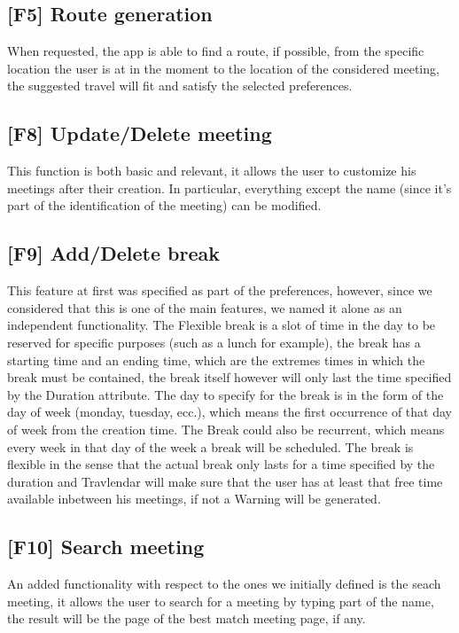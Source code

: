 \subsection{[F5] Route generation}
When requested, the app is able to find a route, if possible, from the specific location the user is at in the moment to the location of the considered meeting, the suggested travel will fit and satisfy the selected preferences.

\subsection{[F8] Update/Delete meeting}
This function is both basic and relevant, it allows the user to customize his meetings after their creation. In particular, everything except the name (since it's part of the identification of the meeting) can be modified.

\subsection{[F9] Add/Delete break}
This feature at first was specified as part of the preferences, however, since we considered that this is one of the main features, we named it alone as an independent functionality. The Flexible break is a slot of time in the day to be reserved for specific purposes (such as a lunch for example), the break has a starting time and an ending time, which are the extremes times in which the break must be contained, the break itself however will only last the time specified by the Duration attribute. The day to specify for the break is in the form of the day of week (monday, tuesday, ecc.), which means the first occurrence of that day of week from the creation time. The Break could also be recurrent, which means every week in that day of the week a break will be scheduled. The break is flexible in the sense that the actual break only lasts for a time specified by the duration and Travlendar will make sure that the user has at least that free time available inbetween his meetings, if not a Warning will be generated.

\subsection{[F10] Search meeting}
An added functionality with respect to the ones we initially defined is the seach meeting, it allows the user to search for a meeting by typing part of the name, the result will be the page of the best match meeting page, if any.



 
